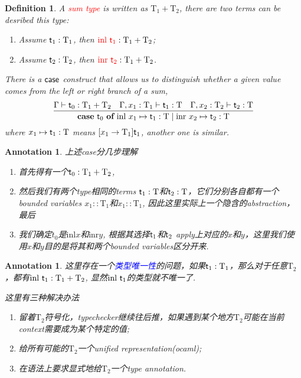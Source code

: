 \documentclass{article}
\theoremstyle{plain}
\newtheorem{definition}[theorem]{Definition}
\newtheorem{annotation}[theorem]{Annotation}
\theoremstyle{nonumberplain}
\newcommand{\inl}[1]{\ensuremath{\text{inl}~#1}}
\newcommand{\inr}[1]{\ensuremath{\text{inr}~#1}}
\newcommand{\caseof}[3]{\ensuremath{{\textbf{case}}~#1~{\textbf{of}}~\inl{x_1}\mapsto #2\mid\inr{x_2}\mapsto #3}}
\newcommand{\singletype}[1]{\text{#1}}
\newcommand{\termtype}[2]{\ensuremath{#1:#2}}
\newcommand{\term}[1]{\ensuremath\mathsf{#1}}
\newcommand{\redt}[1]{\textcolor{red}{#1}}
\newcommand{\bluet}[1]{\textcolor{blue}{#1}}
\begin{document}
\begin{definition}
\rm A \redt{sum type} is written as $\singletype{T}_1 + \singletype{T}_2$, there are two terms can be desribed this type: 
\begin{enumerate}
	\item Assume $\termtype{\term{t}_1}{\singletype{T}_1}$, then $\termtype{\redt{\inl{\term{t}_1}}}{\singletype{T}_1 + \singletype{T}_2}$;
	\item Assume $\termtype{\term{t}_2}{\singletype{T}_2}$, then $\termtype{\redt{\inr{\term{t}_2}}}{\singletype{T}_1 + \singletype{T}_2}$.
\end{enumerate}
There is a $\term{case}$ construct that allows us to distinguish whether a given value comes from the left or right branch of a sum,
$$
\infer{\caseof{\term{t}_0}{\term{t}_1:\singletype{T}}{\term{t}_2:\singletype{T}}}{\Gamma \vdash \term{t}_0:\singletype{T}_1 + \singletype{T}_2 & \Gamma,x_1:\singletype{T}_1 \vdash \term{t}_1:\singletype{T} & \Gamma,x_2:\singletype{T}_2 \vdash \term{t}_2:\singletype{T}}
$$
where $x_1 \mapsto \term{t}_1:\singletype{T}$ means $[x_1 \to \singletype{T}_1]\term{t}_1$, another one is similar. 
\end{definition}

\begin{annotation}
\rm 上述case分几步理解
\begin{enumerate}
	\item 首先得有一个$\term{t}_0:\singletype{T}_1 + \singletype{T}_2$, 
	\item 然后我们有两个type相同的terms $\term{t}_1:\singletype{T}$和$\term{t}_2:\singletype{T}$，它们分别各自都有一个bounded variables $x_1::\singletype{T}_1$和$x_1::\singletype{T}_1$, 因此这里实际上一个隐含的abstraction，最后
	\item 我们确定$t_0$是$\text{inl} x$和$\text{inr} y$, 根据其选择$\term{t}_1$和$\term{t}_2$ apply上对应的$x$和$y$，这里我们使用$x$和$y$目的是将其和两个bounded variables区分开来.
\end{enumerate}
\end{annotation}


\begin{annotation}
\rm 这里存在一个\bluet{类型唯一性}的问题，如果$\termtype{\term{t}_1}{\singletype{T}_1}$，那么对于任意$\singletype{T}_2$，都有$\termtype{\inl{\term{t}_1}}{\singletype{T}_1 + \singletype{T}_2}$, 显然$\inl{\term{t}_1}$的类型就不唯一了. 

这里有三种解决办法
\begin{enumerate}
	\item 留着$\singletype{T}_2$符号化，typechecker继续往后推，如果遇到某个地方$\singletype{T}_2$可能在当前context需要成为某个特定的值;
	\item 给所有可能的$\singletype{T}_2$一个unified representation(ocaml);
	\item 在语法上要求显式地给$\singletype{T}_2$一个type annotation. 
\end{enumerate}
\end{annotation}
\end{document}

